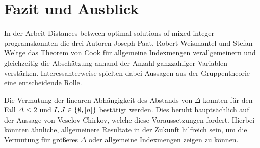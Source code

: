\section{Fazit und Ausblick}

In der Arbeit \glqq Distances between optimal solutions of mixed-integer programs\grqq konnten die drei Autoren Joseph Paat,
Robert Weismantel und Stefan Weltge das Theorem von Cook für allgemeine Indexmengen verallgemeinern und gleichzeitig die Abschätzung anhand der Anzahl ganzzahliger Variablen verstärken.
Interessanterweise spielten dabei Aussagen aus der Gruppentheorie eine entscheidende Rolle.

Die Vermutung der linearen Abhängigkeit des Abstands von $\Delta$ konnten für den Fall $\Delta\leq 2$ und $I,J\in\{\emptyset,[n]\}$ bestätigt werden.
Dies beruht hauptsächlich auf der Aussage von Veselov-Chirkov, welche diese Voraussetzungen fordert.
Hierbei könnten ähnliche, allgemeinere Resultate in der Zukunft hilfreich sein, um die Vermutung für größeres $\Delta$ oder allgemeine Indexmengen zeigen zu können.
